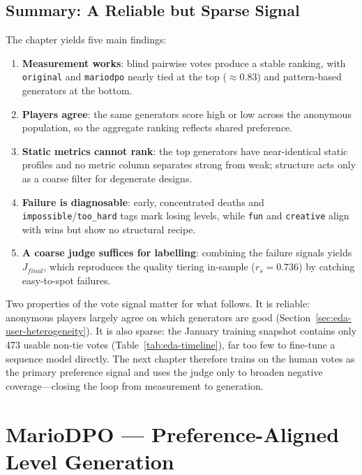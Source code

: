 \documentclass[shortabstract, mgr, english]{iithesis}
\begin{document}
\section[Summary: A Reliable but Sparse Signal]{Summary: A Reliable but Sparse Signal}
\label{sec:eda-summary}

The chapter yields five main findings:
\begin{enumerate}[nosep]
    \item \textbf{Measurement works}: blind pairwise votes produce a stable ranking, with \texttt{original} and \texttt{mariodpo} nearly tied at the top ($\approx$0.83) and pattern-based generators at the bottom.
    \item \textbf{Players agree}: the same generators score high or low across the anonymous population, so the aggregate ranking reflects shared preference.
    \item \textbf{Static metrics cannot rank}: the top generators have near-identical static profiles and no metric column separates strong from weak; structure acts only as a coarse filter for degenerate designs.
    \item \textbf{Failure is diagnosable}: early, concentrated deaths and \texttt{impossible}/\texttt{too\_hard} tags mark losing levels, while \texttt{fun} and \texttt{creative} align with wins but show no structural recipe.
    \item \textbf{A coarse judge suffices for labelling}: combining the failure signals yields $J_{final}$, which reproduces the quality tiering in-sample ($r_s = 0.736$) by catching easy-to-spot failures.
\end{enumerate}

Two properties of the vote signal matter for what follows. It is
reliable: anonymous players largely agree on which generators are good
(Section~\ref{sec:eda-user-heterogeneity}). It is also sparse: the
January training snapshot contains only 473 usable non-tie votes
(Table~\ref{tab:eda-timeline}), far too few to fine-tune a sequence model
directly. The next chapter therefore trains on the human votes as the primary
preference signal and uses the judge only to broaden negative
coverage---closing the loop from measurement to generation.


\chapter{MarioDPO --- Preference-Aligned Level Generation}
\label{ch:mariodpo}
\end{document}
